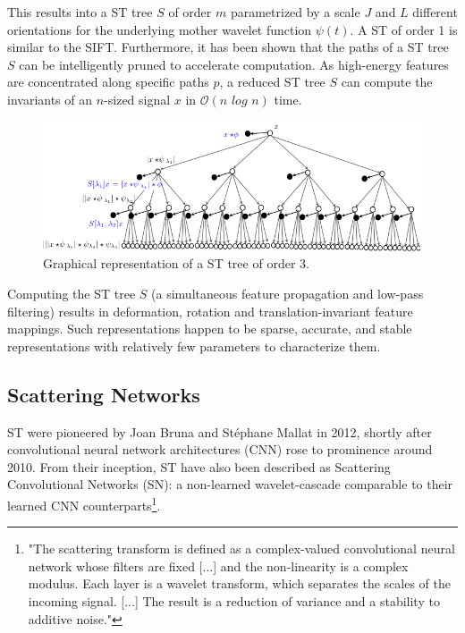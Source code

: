 \documentclass[runningheads]{llncs}
\begin{document}
This results into a ST tree $S$ of order $m$ parametrized by a scale $J$ and $L$ different orientations for the underlying mother wavelet function $\psi(t)$\cite{oyallon}. A ST of order 1 is similar to the SIFT\cite{lowe}. Furthermore, it has been shown that the paths of a ST tree $S$ can be intelligently pruned to accelerate computation. As high-energy features are concentrated along specific paths $p$, a reduced ST tree $S$ can compute the invariants of an $n$-sized signal $x$ in $\mathcal{O}(n\,\,log\,\,n)$ time\cite{bruna2012invariant}.
\begin{figure}
\centering\includegraphics[width=\textwidth]{graph_rep.png}
\caption{Graphical representation of a ST tree of order 3\cite{mallatlecture}.} \label{fig2}
\end{figure}

Computing the ST tree $S$ (a simultaneous feature propagation and low-pass filtering\cite{DSN}) results in deformation, rotation and translation-invariant feature mappings\cite{mallatgroup}\cite{mallatIEEE}\cite{mallatlecture}. Such representations happen to be sparse, accurate, and stable representations with relatively few parameters to characterize them\cite{bruna2012invariant}.

\subsection{Scattering Networks}

ST were pioneered by Joan Bruna and Stéphane Mallat in 2012, shortly after convolutional neural network architectures (CNN) rose to prominence around 2010\cite{lecun}. From their inception, ST have also been described as Scattering Convolutional Networks (SN): a non-learned wavelet-cascade comparable to their learned CNN counterparts\footnote{"The scattering transform is defined as a complex-valued convolutional neural network whose filters are fixed [...] and the non-linearity is a complex modulus. Each layer is a wavelet transform, which separates the scales of the incoming signal. [...] The result is a reduction of variance and a stability to additive noise\cite{andreux}."}\cite{bruna2012invariant}\cite{mallatIEEE}\cite{mallatlecture}\cite{DSN}.
\end{document}
